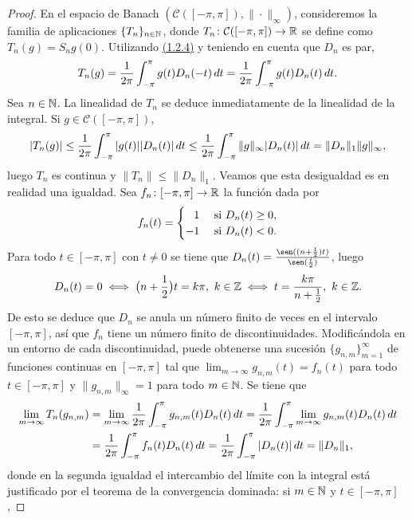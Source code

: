 \documentclass[a4paper, 12pt]{book}
\begin{document}
\begin{proof}
    En el espacio de Banach $(\mathcal{C}([-\pi,\pi]),\|\cdot\|_\infty)$, consideremos la familia de aplicaciones $\{T_n\}_{n\in \mathbb N}$, donde $T_n \colon \mathcal{C}([-\pi,\pi]) \to \mathbb R$ se define como $T_n(g) = S_ng(0)$. Utilizando \hyperref[1.2.4]{(1.2.4)} y teniendo en cuenta que $D_n$ es par,
    \[T_n(g) = \frac{1}{2\pi}\int_{-\pi}^{\pi} g(t)D_n(-t) \, dt = \frac{1}{2\pi}\int_{-\pi}^{\pi} g(t)D_n(t) \, dt.\]
    Sea $n \in \mathbb N$. La linealidad de $T_n$ se deduce inmediatamente de la linealidad de la integral. Si $g \in \mathcal{C}([-\pi,\pi])$,
    \begin{align*}
        |T_n(g)|\leq \frac{1}{2\pi}\int_{-\pi}^{\pi} |g(t)||D_n(t)| \, dt \leq \frac{1}{2\pi}\int_{-\pi}^{\pi} \|g\|_\infty |D_n(t)| \, dt = \|D_n\|_1\|g\|_\infty,
    \end{align*}
    luego $T_n$ es continua y $\|T_n\| \leq \|D_n\|_1$. Veamos que esta desigualdad es en realidad una igualdad. Sea $f_n \colon [-\pi,\pi] \to \mathbb R$ la función dada por
    \[f_n(t) = \begin{cases}
        \phantom{-}1 & $ si $ D_n(t) \geq 0, \\
        -1 & $ si $ D_n(t) < 0.
    \end{cases}\]
    Para todo $t \in [-\pi,\pi]$ con $t \neq 0$ se tiene que $D_n(t) = \frac{\sen((n+\frac{1}{2})t)}{\sen(\frac{t}{2})}$, luego
    \[D_n(t) = 0 \iff \bigl(n+\frac{1}{2}\bigr)t = k \pi, \ k \in \mathbb Z \iff t = \frac{k\pi}{n+\frac{1}{2}}, \ k \in \mathbb Z.\]
    De esto se deduce que $D_n$ se anula un número finito de veces en el intervalo $[-\pi,\pi]$, así que $f_n$ tiene un número finito de discontinuidades. Modificándola en un entorno de cada discontinuidad, puede obtenerse una sucesión $\{g_{n,m}\}_{m=1}^\infty$ de funciones continuas en $[-\pi,\pi]$ tal que $\lim_{m \to \infty}g_{n,m}(t) = f_n(t)$ para todo $t \in [-\pi,\pi]$ y $\|g_{n,m}\|_\infty = 1$ para todo $m \in \mathbb N$. Se tiene que
    \begin{align*}
        \lim_{m \to \infty} T_n(g_{n,m}) &= \lim_{m \to \infty} \frac{1}{2\pi}\int_{-\pi}^{\pi} g_{n,m}(t)D_n(t) \, dt =\frac{1}{2\pi}\int_{-\pi}^{\pi} \lim_{m \to \infty} g_{n,m}(t) D_n(t) \, dt \\
        &= \frac{1}{2\pi}\int_{-\pi}^{\pi} f_n(t) D_n(t) \, dt = \frac{1}{2\pi}\int_{-\pi}^{\pi} |D_n(t)| \, dt = \|D_n\|_1,
    \end{align*}
    donde en la segunda igualdad el intercambio del límite con la integral está justificado por el teorema de la convergencia dominada: si $m \in \mathbb N$ y $t \in [-\pi,\pi]$,

\end{proof}
\end{document}
